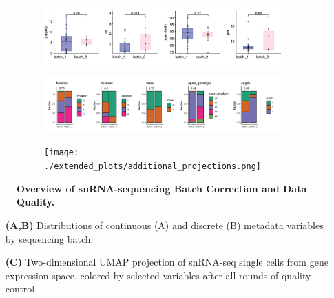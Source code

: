 \begin{figure}[H]
    \begin{subfigure}[t]{\textwidth}
        \caption{}
        \includegraphics[width=\textwidth]{./extended_plots/seq_batch_cont.png}        
    \end{subfigure}
    \begin{subfigure}[t]{\textwidth}
        \caption{}
        \includegraphics[width=\textwidth]{./extended_plots/seq_batch_cat.png}        
    \end{subfigure}  
    \begin{subfigure}[t]{\textwidth}
        \caption{}
        \texttt{[image: ./extended\_plots/additional\_projections.png]}        
    \end{subfigure}   
    \caption{
        \textbf{Overview of snRNA-sequencing Batch Correction and Data Quality.}\\
    }
    \label{fig:snRNA_quality_annotation}
\end{figure}
\begin{itemize}
    \item[\textbf{(A,B)}] Distributions of continuous (A) and discrete (B) metadata variables by sequencing batch. 
    \item[\textbf{(C)}] Two-dimensional UMAP projection of snRNA-seq single cells from gene expression space, colored by selected variables after all rounds of quality control. 
\end{itemize}